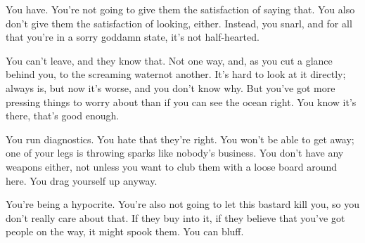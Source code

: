 You have. You're not going to give them the satisfaction of saying that. You also don't give them the satisfaction of looking, either. Instead, you snarl, and for all that you're in a sorry goddamn state, it's not half-hearted. 


You can't leave, and they know that. Not one way, and, as you cut a glance behind you, to the screaming water\textemdash not another. It's hard to look at it directly; always is, but now
it's worse, and you don't know why. But you've got more pressing things to worry about than if you can see the ocean right. You know it's there, that's good enough.

You run diagnostics. You hate that they're right. You won't be able to get away; one of your legs is throwing sparks like nobody's business. You don't have any weapons either, not unless you want to club them with a loose board around here. 
You drag yourself up anyway.


You're being a hypocrite. You're also not going to let this bastard kill you, so you don't really care about that. If they buy into it, if they believe that you've got people on the way, it might spook them. You can bluff.


